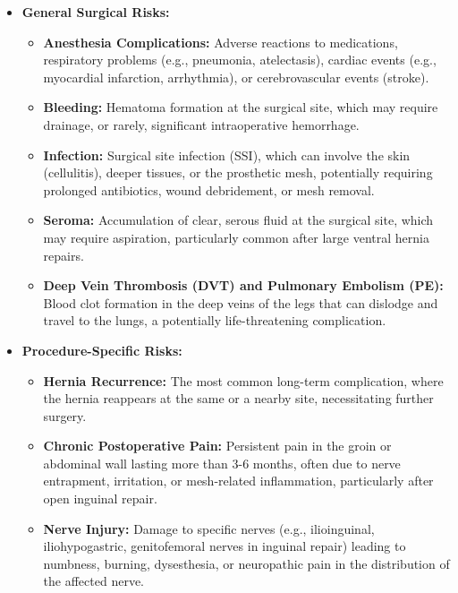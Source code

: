 \begin{itemize}
  \item \textbf{General Surgical Risks:}
  \begin{itemize}
    \item \textbf{Anesthesia Complications:} Adverse reactions to medications, respiratory problems (e.g., pneumonia, atelectasis), cardiac events (e.g., myocardial infarction, arrhythmia), or cerebrovascular events (stroke).
    
    \item \textbf{Bleeding:} Hematoma formation at the surgical site, which may require drainage, or rarely, significant intraoperative hemorrhage.
    
    \item \textbf{Infection:} Surgical site infection (SSI), which can involve the skin (cellulitis), deeper tissues, or the prosthetic mesh, potentially requiring prolonged antibiotics, wound debridement, or mesh removal.
    
    \item \textbf{Seroma:} Accumulation of clear, serous fluid at the surgical site, which may require aspiration, particularly common after large ventral hernia repairs.
    
    \item \textbf{Deep Vein Thrombosis (DVT) and Pulmonary Embolism (PE):} Blood clot formation in the deep veins of the legs that can dislodge and travel to the lungs, a potentially life-threatening complication.
  \end{itemize}

  \item \textbf{Procedure-Specific Risks:}
  \begin{itemize}
    \item \textbf{Hernia Recurrence:} The most common long-term complication, where the hernia reappears at the same or a nearby site, necessitating further surgery.
    
    \item \textbf{Chronic Postoperative Pain:} Persistent pain in the groin or abdominal wall lasting more than 3-6 months, often due to nerve entrapment, irritation, or mesh-related inflammation, particularly after open inguinal repair.
    
    \item \textbf{Nerve Injury:} Damage to specific nerves (e.g., ilioinguinal, iliohypogastric, genitofemoral nerves in inguinal repair) leading to numbness, burning, dysesthesia, or neuropathic pain in the distribution of the affected nerve.
    

\end{itemize}
\end{itemize}
